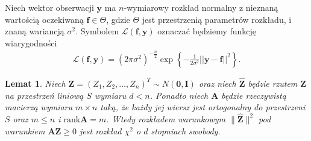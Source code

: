 \documentclass[12pt]{mwart}
\newtheorem{lm}{Lemat}
\begin{document}
Niech wektor obserwacji $\pmb{y}$ ma $n$-wymiarowy rozkład normalny z nieznaną wartością oczekiwaną $\pmb{f}\in \Theta$, gdzie $\Theta$ jest przestrzenią parametrów rozkładu, i znaną wariancją $\sigma^2$.
Symbolem $\mathcal{L}(\pmb{f},\pmb{y})$ oznaczać będziemy funkcję wiarygodności
\begin{eqnarray}
\mathcal{L}(\pmb{f},\pmb{y})=(2\pi\sigma^2)^{-\frac{n}{2}}\exp{\left\{-\frac{1}{2\sigma^2}||\pmb{y}-\pmb{f}||^2\right\}}.
\end{eqnarray}
\begin{lm}\label{rozklad1}
Niech $\pmb{Z}=(Z_1,Z_2,\dots,Z_n)^T\sim N(\pmb{0},\textbf{I})$ oraz niech $\hat{\pmb{Z}}$ będzie rzutem $\pmb{Z}$ na przestrzeń liniową $S$ wymiaru $d<n$. Ponadto niech $\pmb{A}$ będzie rzeczywistą macierzą wymiaru $m\times n$ taką, że każdy jej wiersz jest ortogonalny do przestrzeni $S$ oraz $m\leq n$ i $\textrm{rank} \pmb{A}=m$. Wtedy rozkładem warunkowym $\|\hat{\pmb{Z}}\|^2$ pod warunkiem $\pmb{AZ}\geq 0$ jest rozkład $\chi^2$ o $d$ stopniach swobody.
\end{lm}
\end{document}
